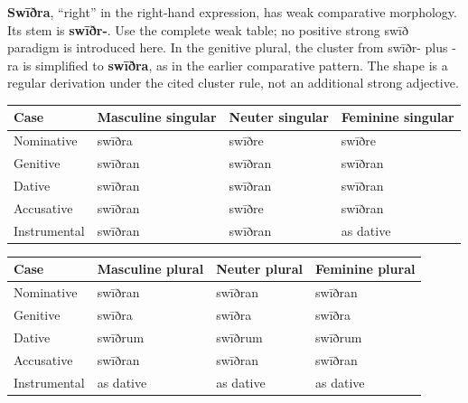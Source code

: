 \textbf{Swīðra}, “right” in the right-hand expression, has weak comparative morphology. Its stem is \textbf{swīðr-}. Use the complete weak table; no positive strong swīð paradigm is introduced here. In the genitive plural, the cluster from swīðr- plus -ra is simplified to \textbf{swīðra}, as in the earlier comparative pattern. The shape is a regular derivation under the cited cluster rule, not an additional strong adjective.

\par\begingroup
\fontsize{10.5}{13.2}\selectfont
\setlength{\LTleft}{0pt}\setlength{\LTright}{\fill}
\noindent
\begin{tabular}{@{}>{\raggedright\arraybackslash}p{22.0mm}>{\raggedright\arraybackslash}p{31.188mm}>{\raggedright\arraybackslash}p{31.188mm}>{\raggedright\arraybackslash}p{31.188mm}@{}}
\toprule
\textbf{Case} & \textbf{Masculine singular} & \textbf{Neuter singular} & \textbf{Feminine singular} \\
\midrule
Nominative & swīðra & swīðre & swīðre \\
Genitive & swīðran & swīðran & swīðran \\
Dative & swīðran & swīðran & swīðran \\
Accusative & swīðran & swīðre & swīðran \\
Instrumental & swīðran & swīðran & as dative \\
\bottomrule
\end{tabular}
\par\endgroup
\par\addvspace{5pt}
\par\begingroup
\fontsize{10.5}{13.2}\selectfont
\setlength{\LTleft}{0pt}\setlength{\LTright}{\fill}
\noindent
\begin{tabular}{@{}>{\raggedright\arraybackslash}p{22.0mm}>{\raggedright\arraybackslash}p{31.188mm}>{\raggedright\arraybackslash}p{31.188mm}>{\raggedright\arraybackslash}p{31.188mm}@{}}
\toprule
\textbf{Case} & \textbf{Masculine plural} & \textbf{Neuter plural} & \textbf{Feminine plural} \\
\midrule
Nominative & swīðran & swīðran & swīðran \\
Genitive & swīðra & swīðra & swīðra \\
Dative & swīðrum & swīðrum & swīðrum \\
Accusative & swīðran & swīðran & swīðran \\
Instrumental & as dative & as dative & as dative \\
\bottomrule
\end{tabular}
\par\endgroup

